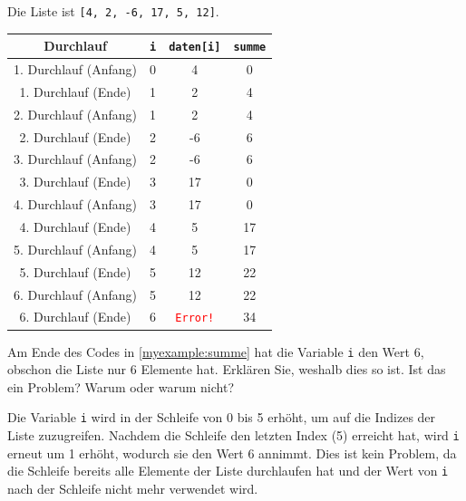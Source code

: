 \begin{myexercise}
	\begin{myanswer}
		Die Liste ist \lstinline|[4, 2, -6, 17, 5, 12]|.
		\begin{table}[H]
			\centering
		
			\begin{tabular}{c|c|c|c}
				\textbf{Durchlauf} & \lstinline|i| & \lstinline|daten[i]| & \lstinline|summe|\\\midrule\midrule
				1. Durchlauf (Anfang)      & 0             & 4                    & 0              \\\midrule
				1. Durchlauf (Ende)      & 1             & 2                    & 4              \\\midrule\midrule
				2. Durchlauf (Anfang)       & 1             & 2                    & 4              \\\midrule
				2. Durchlauf (Ende)       & 2             & -6                   & 6              \\\midrule\midrule
				3. Durchlauf (Anfang)       & 2             & -6                   & 6              \\\midrule
				3. Durchlauf (Ende)       & 3             & 17                   & 0              \\\midrule\midrule
				4. Durchlauf (Anfang)       & 3             & 17                   & 0              \\\midrule
				4. Durchlauf (Ende)       & 4             & 5                    & 17             \\\midrule\midrule
				5. Durchlauf (Anfang)       & 4             & 5                    & 17             \\\midrule
				5. Durchlauf (Ende)       & 5             & 12                   & 22             \\\midrule\midrule
				6. Durchlauf (Anfang)       & 5             & 12                   & 22             \\\midrule
				6. Durchlauf (Ende)       & 6             & \textcolor{red}{\texttt{Error!}}                    & 34             \\
			\end{tabular}
		\end{table}
	\end{myanswer}
\end{myexercise}

\begin{myexercise}
	Am Ende des Codes in \cref{myexample:summe} hat die Variable \lstinline|i| den Wert 6, obschon die Liste nur 6 Elemente hat. Erklären Sie, weshalb dies so ist. Ist das ein Problem? Warum oder warum nicht?
	\begin{myanswer}
		Die Variable \lstinline|i| wird in der Schleife von 0 bis 5 erhöht, um auf die Indizes der Liste zuzugreifen. Nachdem die Schleife den letzten Index (5) erreicht hat, wird \lstinline|i| erneut um 1 erhöht, wodurch sie den Wert 6 annimmt. Dies ist kein Problem, da die Schleife bereits alle Elemente der Liste durchlaufen hat und der Wert von \lstinline|i| nach der Schleife nicht mehr verwendet wird.
	\end{myanswer}
\end{myexercise}

